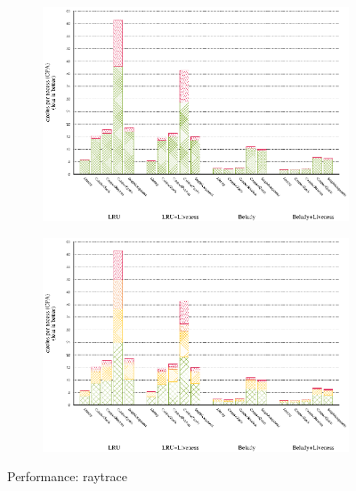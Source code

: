 \begin{figure}[!ht]
  \begin{subfigure}[b]{0.5\textwidth}%
    \includegraphics[width=\textwidth]{figs/plots/perf-misses-raytrace.eps}
  \end{subfigure}%
  \begin{subfigure}[b]{0.5\textwidth}%
    \includegraphics[width=\textwidth]{figs/plots/perf-raytrace.eps}
  \end{subfigure}%
  \caption{Performance: raytrace}
  \label{fig:performance-raytrace}
\end{figure}

